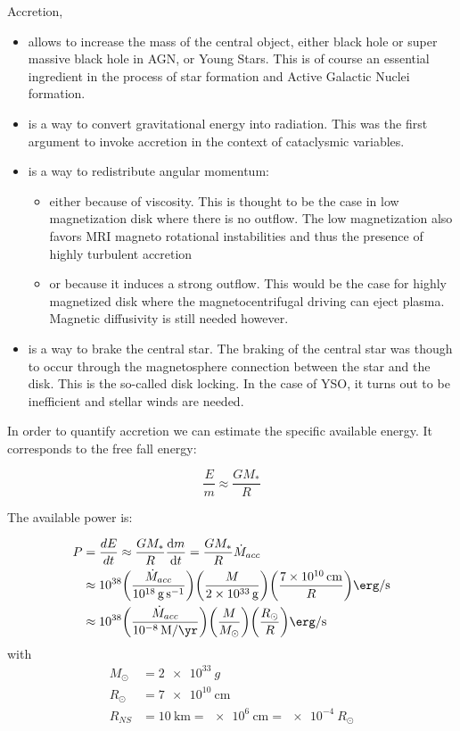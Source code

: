 \documentclass[10pt,a4paper,english,draft]{article}
\let\originalleft\left
\let\originalright\right
\renewcommand{\left}{\mathopen{}\mathclose\bgroup\originalleft}
\renewcommand{\right}{\aftergroup\egroup\originalright}
\begin{document}
Accretion,
\begin{itemize}
    \item allows to increase the mass of the central object, either black hole
          or super massive black hole in AGN, or Young Stars. This is of course
          an essential ingredient in the process of star formation and Active
          Galactic Nuclei formation.
    \item is a way to convert gravitational energy into radiation. This was the
          first argument to invoke accretion in the context of cataclysmic
          variables.
    \item is a way to redistribute angular momentum:
          \begin{itemize}
              \item either because of viscosity. This is thought to be the case
                    in low magnetization disk where there is no outflow. The
                    low magnetization also favors MRI magneto rotational
                    instabilities and thus the presence of highly turbulent
                    accretion
              \item or because it induces a strong outflow. This would be the
                    case for highly magnetized disk where the
                    magnetocentrifugal driving can eject plasma. Magnetic
                    diffusivity is still needed however.
          \end{itemize}
    \item is a way to brake the central star. The braking of the central star
          was though to occur through the magnetosphere connection between the
          star and the disk. This is the so-called disk locking. In the case of
          YSO, it turns out to be inefficient and stellar winds are needed.
\end{itemize}

In order to quantify accretion we can estimate the specific available energy.
It corresponds to the free fall energy:

\begin{equation}
  \frac{E}{m} \approx \frac{GM_*}{R}
\end{equation}

The available power is:

\begin{align}
P & = \frac{dE}{dt} \approx \frac{GM_*}{R} \frac{\d m}{\d t} = \frac{GM_*}{R} \dot{M}_{acc}
    \\
  &\approx \num{e38} \left(\frac{\dot{M}_{acc}}{\SI{e18}{\g\per\s}}\right) \left(\frac{M}{\SI{2e33}{\g}}\right) \left(\frac{\SI{7e10}{\cm}}{R}\right) \si{\erg\per\s}
    \\
  &\approx 10^{38} \left(\frac{\dot{M}_{acc}}{\SI{e-8}{M\per\yr}}\right) \left(\frac{M}{M_{\odot}}\right) \left(\frac{R_{\odot}}{R}\right) \si{\erg\per\s}
\end{align}
with
\begin{align}
  M_{\odot} &= \SI{2e33}{g} \\
  R_{\odot} &= \SI{7e10}{\cm} \\
  R_{NS}   &= \SI{10}{\km} = \SI{e6}{\cm} = \SI{e-4}{R_\odot}
\end{align}
\end{document}
